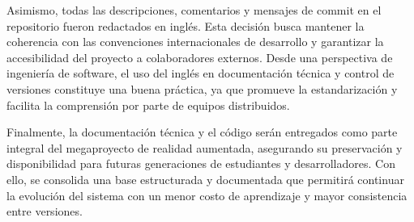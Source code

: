 Asimismo, todas las descripciones, comentarios y mensajes de commit en el repositorio fueron redactados en inglés. Esta decisión busca mantener la coherencia con las convenciones internacionales de desarrollo y garantizar la accesibilidad del proyecto a colaboradores externos. Desde una perspectiva de ingeniería de software, el uso del inglés en documentación técnica y control de versiones constituye una buena práctica, ya que promueve la estandarización y facilita la comprensión por parte de equipos distribuidos. %

Finalmente, la documentación técnica y el código serán entregados como parte integral del megaproyecto de realidad aumentada, asegurando su preservación y disponibilidad para futuras generaciones de estudiantes y desarrolladores. Con ello, se consolida una base estructurada y documentada que permitirá continuar la evolución del sistema con un menor costo de aprendizaje y mayor consistencia entre versiones.
